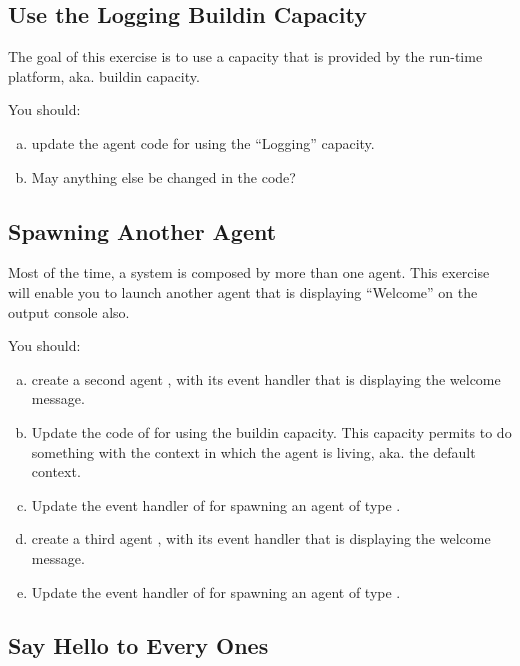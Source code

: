 \documentclass[article,english,nodocumentinfo]{multiagentfrreport}
\begin{document}

\subsection{Use the Logging Buildin Capacity}

The goal of this exercise is to use a capacity that is provided by the run-time platform, aka. buildin capacity.

You should:
\begin{enumerate}[a)]
\item update the agent code for using the ``Logging'' capacity.
\item May anything else be changed in the code?
\end{enumerate}

\subsection{Spawning Another Agent}

Most of the time, a system is composed by more than one agent. This exercise will enable you to launch another agent that is displaying ``Welcome'' on the output console also.

You should:
\begin{enumerate}[a)]
\item create a second agent , with its  event handler that is displaying the welcome message.
\item Update the code of  for using the  buildin capacity. This capacity permits to do something with the context in which the agent is living, aka. the default context.
\item Update the  event handler of  for spawning an agent of type .
\item create a third agent , with its  event handler that is displaying the welcome message.
\item Update the  event handler of  for spawning an agent of type .
\end{enumerate}

\subsection{Say Hello to Every Ones}
\end{document}
